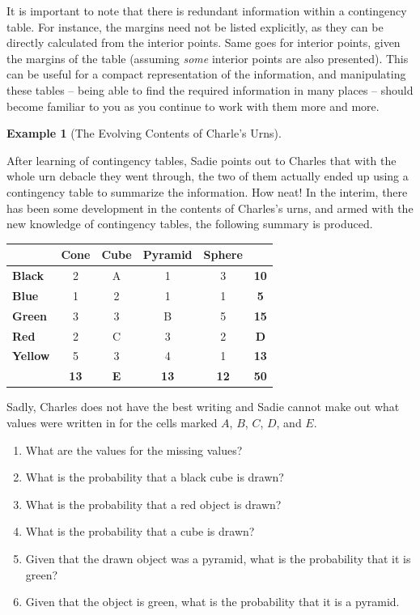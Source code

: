\documentclass[
  letterpaper,
  DIV=11,
  numbers=noendperiod]{scrreprt}
\providecommand{\tightlist}{%
  \setlength{\itemsep}{0pt}\setlength{\parskip}{0pt}}\usepackage{longtable,booktabs,array}
\theoremstyle{definition}
\theoremstyle{definition}
\theoremstyle{definition}
\newtheorem{example}{Example}[chapter]
\theoremstyle{remark}
\begin{document}
It is important to note that there is redundant information within a
contingency table. For instance, the margins need not be listed
explicitly, as they can be directly calculated from the interior points.
Same goes for interior points, given the margins of the table (assuming
\emph{some} interior points are also presented). This can be useful for
a compact representation of the information, and manipulating these
tables -- being able to find the required information in many places --
should become familiar to you as you continue to work with them more and
more.

\begin{example}[The Evolving Contents of Charle's
Urns]\protect\hypertarget{exm-charles-contingency-table}{}\label{exm-charles-contingency-table}

After learning of contingency tables, Sadie points out to Charles that
with the whole urn debacle they went through, the two of them actually
ended up using a contingency table to summarize the information. How
neat! In the interim, there has been some development in the contents of
Charles's urns, and armed with the new knowledge of contingency tables,
the following summary is produced.

\begin{tabular}{>{}l|c|c|c|c|>{}c}
\hline
  & Cone & Cube & Pyramid & Sphere & \\
\hline
\textbf{Black} & 2 & A & 1 & 3 & \textbf{10}\\
\hline
\textbf{Blue} & 1 & 2 & 1 & 1 & \textbf{5}\\
\hline
\textbf{Green} & 3 & 3 & B & 5 & \textbf{15}\\
\hline
\textbf{Red} & 2 & C & 3 & 2 & \textbf{D}\\
\hline
\textbf{Yellow} & 5 & 3 & 4 & 1 & \textbf{13}\\
\hline
\textbf{\textbf{}} & \textbf{13} & \textbf{E} & \textbf{13} & \textbf{12} & \textbf{\textbf{50}}\\
\hline
\end{tabular}

Sadly, Charles does not have the best writing and Sadie cannot make out
what values were written in for the cells marked \(A\), \(B\), \(C\),
\(D\), and \(E\).

\begin{enumerate}
\def\labelenumi{\alph{enumi}.}
\tightlist
\item
  What are the values for the missing values?
\item
  What is the probability that a black cube is drawn?
\item
  What is the probability that a red object is drawn?
\item
  What is the probability that a cube is drawn?
\item
  Given that the drawn object was a pyramid, what is the probability
  that it is green?
\item
  Given that the object is green, what is the probability that it is a
  pyramid.
\end{enumerate}


\end{example}
\end{document}
